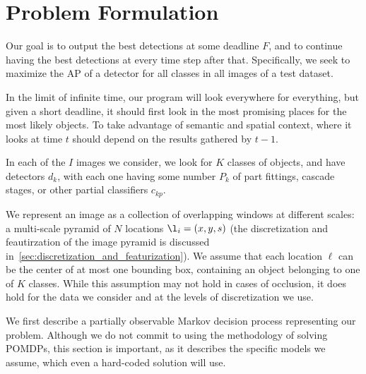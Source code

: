 \section{Problem Formulation}
Our goal is to output the best detections at some deadline $F$, and to continue having the best detections at every time step after that.
Specifically, we seek to maximize the AP of a detector for all classes in all images of a test dataset.

In the limit of infinite time, our program will look everywhere for everything, but given a short deadline, it should first look in the most promising places for the most likely objects.
To take advantage of semantic and spatial context, where it looks at time $t$ should depend on the results gathered by $t-1$.

In each of the $I$ images we consider, we look for $K$ classes of objects, and have detectors $d_k$, with each one having some number $P_k$ of part fittings, cascade stages, or other partial classifiers $c_{kp}$.

We represent an image as a collection of overlapping windows at different scales: a multi-scale pyramid of $N$ locations $\l_i = (x,y,s)$ (the discretization and feautirzation of the image pyramid is discussed in~\autoref{sec:discretization_and_featurization}).
We assume that each location $\ell$ can be the center of at most one bounding box, containing an object belonging to one of $K$ classes.
While this assumption may not hold in cases of occlusion, it does hold for the data we consider and at the levels of discretization we use. 


We first describe a partially observable Markov decision process representing our problem.
Although we do not commit to using the methodology of solving POMDPs, this section is important, as it describes the specific models we assume, which even a hard-coded solution will use.

